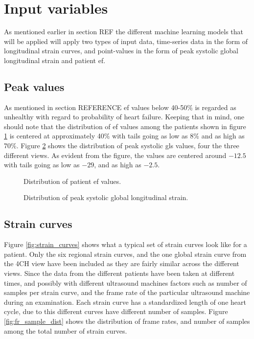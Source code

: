 \section{Input variables} \label{sec:covariates}
As mentioned earlier in section REF the different machine learning models that will be applied will apply two types of input data, 
time-series data in the form of longitudinal strain curves, and point-values in the form of peak systolic global longitudinal strain and patient \acrshort{ef}. \bigskip

\subsection{Peak values}
As mentioned in section REFERENCE \acrshort{ef} values below 40-50$\%$ is regarded as unhealthy with regard to probability of heart failure. 
Keeping that in mind, one should note that the distribution of \acrshort{ef} values among the patients shown in figure \ref{fig:EF_dist} 
is centered at approximately 40$\%$ with tails going as low as 8$\%$ and as high as 70$\%$. 
Figure \ref{fig:gls_dist} shows the distribution of peak systolic \acrshort{gls} values, four the three different views. 
As evident from the figure, the values are centered around $-12.5$ with tails going as low as $-29$, and as high as $-2.5$. \bigskip

\begin{figure}[h]
    \centering
    
    \caption{Distribution of patient \acrshort{ef} values.}
    \label{fig:EF_dist}
\end{figure}

\begin{figure}
    \centering
    
    \caption{Distribution of peak systolic global longitudinal strain.}
    \label{fig:gls_dist}
\end{figure}

\subsection{Strain curves}
Figure \ref{fig:strain_curves} shows what a typical set of strain curves look like for a patient. 
Only the six regional strain curves, and the one global strain curve from the 4CH view have been included as they are fairly similar across the different views. 
Since the data from the different patients have been taken at different times, and possibly with different ultrasound machines 
factors such as number of samples per strain curve, and the frame rate of the particular ultrasound machine during an examination. 
Each strain curve has a standardized length of one heart cycle, due to this different curves have different number of samples. 
Figure \ref{fig:fr_sample_dist} shows the distribution of frame rates, and number of samples among the total number of strain curves. \bigskip

